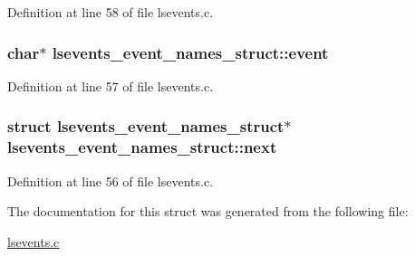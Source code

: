 Definition at line 58 of file lsevents.\-c.

\hypertarget{structlsevents__event__names__struct_a07e5a0f2b74c08f388626f18b37cd1b0}{
\subsubsection[{event}]{\setlength{\rightskip}{0pt plus 5cm}char$\ast$ lsevents\-\_\-event\-\_\-names\-\_\-struct\-::event}}\label{structlsevents__event__names__struct_a07e5a0f2b74c08f388626f18b37cd1b0}


Definition at line 57 of file lsevents.\-c.

\hypertarget{structlsevents__event__names__struct_a748e63bd8825f239936c5bf165ca869e}{
\subsubsection[{next}]{\setlength{\rightskip}{0pt plus 5cm}struct {\bf lsevents\-\_\-event\-\_\-names\-\_\-struct}$\ast$ lsevents\-\_\-event\-\_\-names\-\_\-struct\-::next}}\label{structlsevents__event__names__struct_a748e63bd8825f239936c5bf165ca869e}


Definition at line 56 of file lsevents.\-c.



The documentation for this struct was generated from the following file\-:\begin{DoxyCompactItemize}
\item 
\hyperlink{lsevents_8c}{lsevents.\-c}\end{DoxyCompactItemize}
